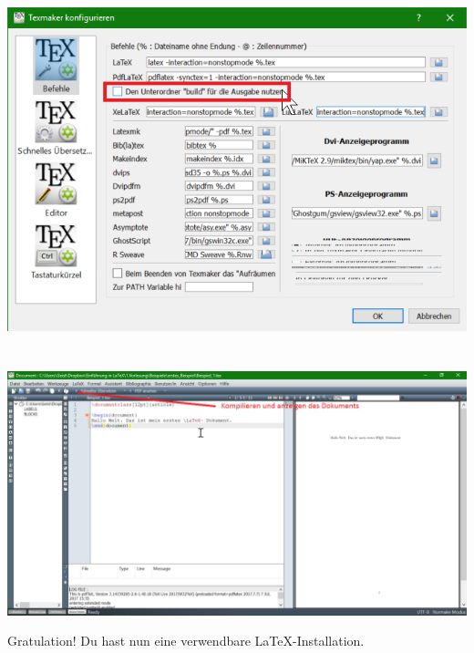 \documentclass[12pt]{article}
\begin{document}
\noindent
\begin{minipage}[c]{\textwidth}
\centering
{}
\includegraphics[width=.9\textwidth]{windows/texmaker3.png}
\\~\\~\\
\includegraphics[width=\textwidth]{windows/texmaker5.png}
\end{minipage}


\begin{center}
Gratulation! Du hast nun eine verwendbare LaTeX-Installation.
\end{center}
\FloatBarrier
\end{document}
